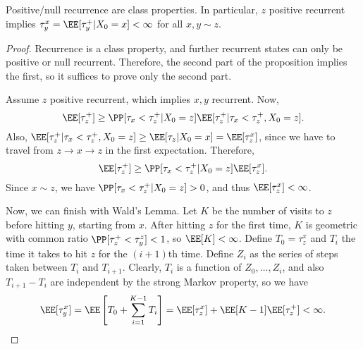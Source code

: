 \begin{theorem}
\proplabel

Positive/null recurrence are class properties. In particular, $z$ positive recurrent implies $\tau_y^{x} = \EE[\tau_y^+|X_0=x]<\infty$ for all $x,y\sim z$. 
\end{theorem}

\begin{proof}
Recurrence is a class property, and further recurrent states can only be positive or null recurrent. Therefore, the second part of the proposition implies the first, so it suffices to prove only the second part. 

Assume $z$ positive recurrent, which implies $x,y$ recurrent. Now, 
\[\EE[\tau_z^+]\geq \PP[\tau_x < \tau_z^+|X_0=z]\EE[\tau_z^+|\tau_x<\tau_z^+, X_0=z].\]
Also, $\EE[\tau_z^+|\tau_x<\tau_z^+, X_0=z]\geq \EE[\tau_z|X_0=x] = \EE[\tau_z^x]$, since we have to travel from $z\rightarrow x\rightarrow z$ in the first expectation. Therefore, 
\[\EE[\tau_z^+]\geq \PP[\tau_x<\tau_z^+|X_0=z]\EE[\tau_z^x].\]
Since $x\sim z$, we have $\PP[\tau_x < \tau_z^+|X_0=z]>0$, and thus $\EE[\tau_z^x]<\infty$. 

Now, we can finish with Wald's Lemma. Let $K$ be the number of visits to $z$ before hitting $y$, starting from $x$. After hitting $z$ for the first time, $K$ is geometric with common ratio $\PP[\tau_z^+<\tau_y^z]<1$, so $\EE[K]<\infty$. Define $T_0=\tau_z^x$ and $T_i$ the time it takes to hit $z$ for the $(i+1)$th time. Define $Z_i$ as the series of steps taken between $T_i$ and $T_{i+1}$. Clearly, $T_i$ is a function of $Z_0, \hdots, Z_i$, and also $T_{i+1}-T_i$ are independent by the strong Markov property, so we have 
\[\EE[\tau_y^x] = \EE\left[T_0+\sum_{i=1}^{K-1}T_i\right] = \EE[\tau_z^x] + \EE[K-1]\EE[\tau_z^+] < \infty.\]
\end{proof}